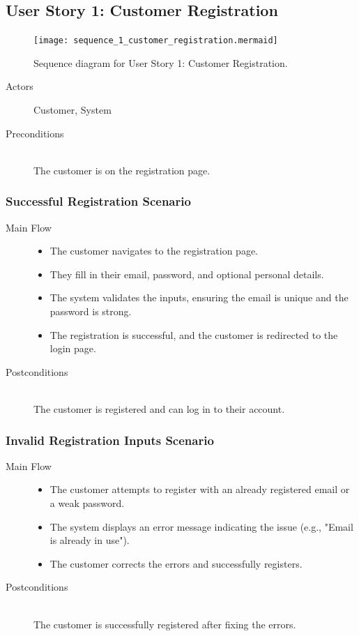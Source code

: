 \documentclass[twoside,a4paper,journal]{IEEEtran}
\begin{document}
\subsection{User Story 1: Customer Registration}
\begin{figure}[!t]
\centering
\texttt{[image: sequence\_1\_customer\_registration.mermaid]}
\caption{Sequence diagram for User Story 1: Customer Registration.}
\label{fig:sequence_1}
\end{figure}
\begin{description}
  \item[Actors] Customer, System
  \item[Preconditions] \hfill \\
    The customer is on the registration page.
\end{description}
\subsubsection{Successful Registration Scenario}
\begin{description}
  \item[Main Flow] \hfill
    \begin{itemize}
      \item The customer navigates to the registration page.
      \item They fill in their email, password, and optional personal details.
      \item The system validates the inputs, ensuring the email is unique and the
        password is strong.
      \item The registration is successful, and the customer is redirected to the
        login page.
    \end{itemize}
  \item[Postconditions] \hfill \\
    The customer is registered and can log in to their account.
\end{description}
\subsubsection{Invalid Registration Inputs Scenario}
\begin{description}
  \item[Main Flow] \hfill
    \begin{itemize}
      \item The customer attempts to register with an already registered email
        or a weak password.
      \item The system displays an error message indicating the issue
        (e.g., "Email is already in use").
      \item The customer corrects the errors and successfully registers.
    \end{itemize}
  \item[Postconditions] \hfill \\
    The customer is successfully registered after fixing the errors.
\end{description}
\end{document}
